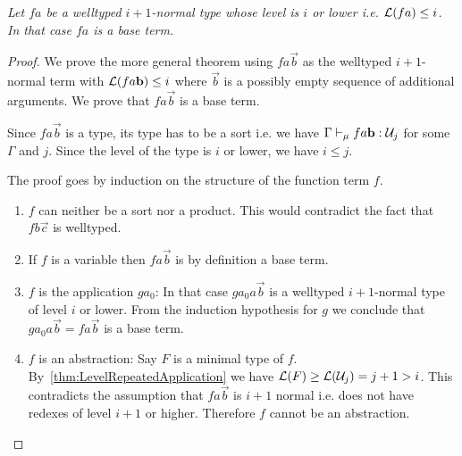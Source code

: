 \begin{theorem}
    \label{thm:NormalBaseTerm}
    \emph{Let $fa$ be a welltyped $i+1$-normal type whose level is $i$ or lower
    i.e. ${\cal L}(f a) \le i$.
    In that case $f a$ is a base term.}

    \begin{proof}
        We prove the more general theorem using $f a \vec b$ as the welltyped
        $i+1$-normal term with ${\cal L}(f a {\mathbf b}) \le i$ where $\vec b$ is a
        possibly empty sequence of additional arguments.
        We prove that $f a \vec b$ is a base term.

        Since $f a \vec b$ is a type, its type has to be a sort i.e. we have
        $\Gamma \vdash_\mu f a {\mathbf b}: {\cal U}_j$ for some $\Gamma$ and $j$. Since the
        level of the type is $i$ or lower, we have $i \le j$.

        The proof goes by induction on the structure of the function term $f$.
        \begin{enumerate}

            \item $f$ can neither be a sort nor a product. This would contradict
                the fact that $f b \vec c$ is welltyped.

            \item If $f$ is a variable then $f a \vec b$ is by definition a base
                term.

            \item $f$ is the application $ga_0$: In that case $ga_0 a \vec b$ is
                a welltyped $i+1$-normal type of level $i$ or lower.
                From the induction hypothesis for $g$ we conclude that $g a_0
                a \vec b = f a \vec b$ is a base term.

            \item $f$ is an abstraction:
                Say $F$ is a minimal type of $f$.
                By~\ref{thm:LevelRepeatedApplication} we have ${\cal L}(F) \ge
                {\cal L}({\cal U}_j) = j + 1 > i$. This contradicts the assumption that
                $f a \vec b$ is $i+1$ normal i.e. does not have redexes of level
                $i + 1$ or higher. Therefore $f$ cannot be an abstraction.
        \end{enumerate}
    \end{proof}
\end{theorem}


